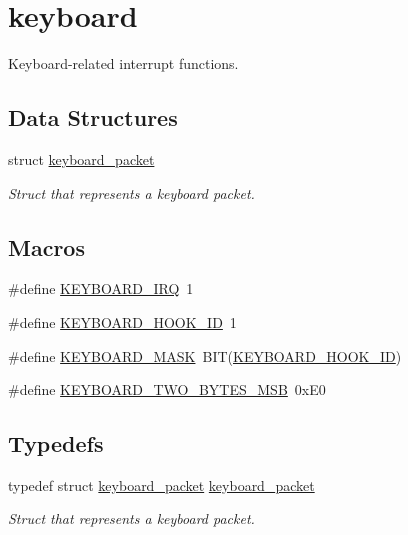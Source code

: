 \hypertarget{group__keyboard}{}\section{keyboard}
\label{group__keyboard}


Keyboard-\/related interrupt functions.  


\subsection*{Data Structures}
\begin{DoxyCompactItemize}
\item 
struct \hyperlink{structkeyboard__packet}{keyboard\+\_\+packet}
\begin{DoxyCompactList}\small\item\em Struct that represents a keyboard packet. \end{DoxyCompactList}\end{DoxyCompactItemize}
\subsection*{Macros}
\begin{DoxyCompactItemize}
\item 
\#define \hyperlink{group__keyboard_ga2d17911b50c0aeebb2e3325c5b36d4f2}{K\+E\+Y\+B\+O\+A\+R\+D\+\_\+\+I\+RQ}~1
\item 
\#define \hyperlink{group__keyboard_ga03c0bb70d0f678541f822faab96376bc}{K\+E\+Y\+B\+O\+A\+R\+D\+\_\+\+H\+O\+O\+K\+\_\+\+ID}~1
\item 
\#define \hyperlink{group__keyboard_ga67f9ce144f998dd5c8b1ae5e25fb8dec}{K\+E\+Y\+B\+O\+A\+R\+D\+\_\+\+M\+A\+SK}~B\+IT(\hyperlink{group__keyboard_ga03c0bb70d0f678541f822faab96376bc}{K\+E\+Y\+B\+O\+A\+R\+D\+\_\+\+H\+O\+O\+K\+\_\+\+ID})
\item 
\#define \hyperlink{group__keyboard_gaa639f3ee505b0f62686d71087830b1d5}{K\+E\+Y\+B\+O\+A\+R\+D\+\_\+\+T\+W\+O\+\_\+\+B\+Y\+T\+E\+S\+\_\+\+M\+SB}~0x\+E0
\end{DoxyCompactItemize}
\subsection*{Typedefs}
\begin{DoxyCompactItemize}
\item 
typedef struct \hyperlink{structkeyboard__packet}{keyboard\+\_\+packet} \hyperlink{group__keyboard_ga823c244c9bc4e1f5004a548133e112d9}{keyboard\+\_\+packet}
\begin{DoxyCompactList}\small\item\em Struct that represents a keyboard packet. \end{DoxyCompactList}\end{DoxyCompactItemize}
